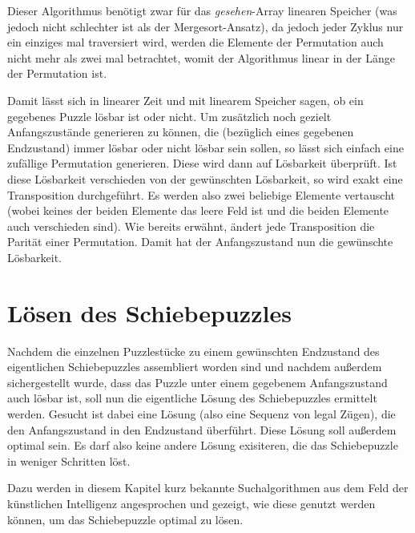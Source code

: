 \documentclass{whswinvcbook}
\begin{document}
Dieser Algorithmus benötigt zwar für das \textit{gesehen}-Array linearen Speicher (was jedoch nicht schlechter ist als der Mergesort-Ansatz), da jedoch jeder Zyklus nur ein einziges mal traversiert wird, werden die Elemente der Permutation auch nicht mehr als zwei mal betrachtet, womit der Algorithmus linear in der Länge der Permutation ist.

Damit lässt sich in linearer Zeit und mit linearem Speicher sagen, ob ein gegebenes Puzzle lösbar ist oder nicht. Um zusätzlich noch gezielt Anfangszustände generieren zu können, die (bezüglich eines gegebenen Endzustand) immer lösbar oder nicht lösbar sein sollen, so lässt sich einfach eine zufällige Permutation generieren. Diese wird dann auf Lösbarkeit überprüft. Ist diese Lösbarkeit verschieden von der gewünschten Lösbarkeit, so wird exakt eine Transposition durchgeführt. Es werden also zwei beliebige Elemente vertauscht (wobei keines der beiden Elemente das leere Feld ist und die beiden Elemente auch verschieden sind). Wie bereits erwähnt, ändert jede Transposition die Parität einer Permutation. Damit hat der Anfangszustand nun die gewünschte Lösbarkeit.
\chapter{Lösen des Schiebepuzzles}
Nachdem die einzelnen Puzzlestücke zu einem gewünschten Endzustand des eigentlichen Schiebepuzzles assembliert worden sind und nachdem außerdem sichergestellt wurde, dass das Puzzle unter einem gegebenem Anfangszustand auch lösbar ist, soll nun die eigentliche Lösung des Schiebepuzzles ermittelt werden. Gesucht ist dabei eine Lösung (also eine Sequenz von legal Zügen), die den Anfangszustand in den Endzustand überführt. Diese Lösung soll außerdem optimal sein. Es darf also keine andere Lösung exisiteren, die das Schiebepuzzle in weniger Schritten löst.

Dazu werden in diesem Kapitel kurz bekannte Suchalgorithmen aus dem Feld der künstlichen Intelligenz angesprochen und gezeigt, wie diese genutzt werden können, um das Schiebepuzzle optimal zu lösen.
\end{document}
